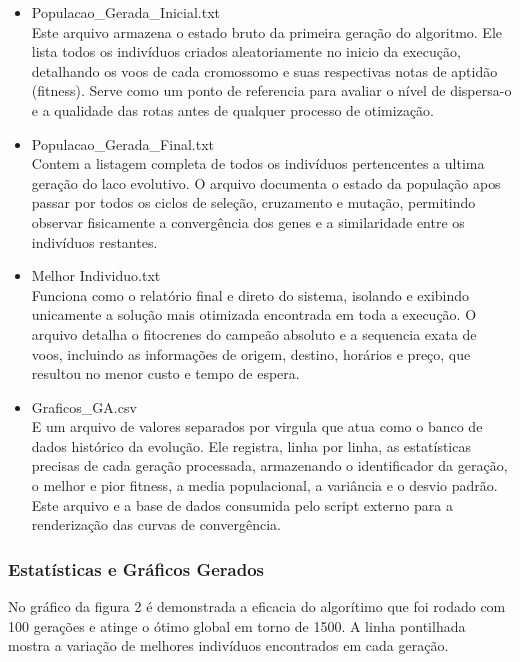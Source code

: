 \documentclass[conference]{IEEEtran}
\begin{document}
\begin{itemize}
	\item Populacao\_Gerada\_Inicial.txt \\
	Este arquivo armazena o estado bruto da primeira geração do algoritmo. Ele lista todos os indivíduos criados aleatoriamente no inicio da execução, detalhando os voos de cada cromossomo e suas respectivas notas de aptidão (fitness). Serve como um ponto de referencia para avaliar o nível de dispersa-o e a qualidade das rotas antes de qualquer processo de otimização.
	
	\item Populacao\_Gerada\_Final.txt \\
	Contem a listagem completa de todos os indivíduos pertencentes a ultima geração do laco evolutivo. O arquivo documenta o estado da população apos passar por todos os ciclos de seleção, cruzamento e mutação, permitindo observar fisicamente a convergência dos genes e a similaridade entre os indivíduos restantes.
	
	\item Melhor Individuo.txt \\
	Funciona como o relatório final e direto do sistema, isolando e exibindo unicamente a solução mais otimizada encontrada em toda a execução. O arquivo detalha o fitocrenes do campeão absoluto e a sequencia exata de voos, incluindo as informações de origem, destino, horários e preço, que resultou no menor custo e tempo de espera.
	
	\item Graficos\_GA.csv \\
	E um arquivo de valores separados por virgula que atua como o banco de dados histórico da evolução. Ele registra, linha por linha, as estatísticas precisas de cada geração processada, armazenando o identificador da geração, o melhor e pior fitness, a media populacional, a variância e o desvio padrão. Este arquivo e a base de dados consumida pelo script externo para a renderização das curvas de convergência.
\end{itemize}

\subsubsection{Estatísticas e Gráficos Gerados}

No gráfico da figura 2 é demonstrada a eficacia do algorítimo que foi rodado com 100 gerações e atinge o ótimo global  em torno de 1500. A linha pontilhada mostra a variação de melhores indivíduos encontrados em cada geração.
\end{document}
